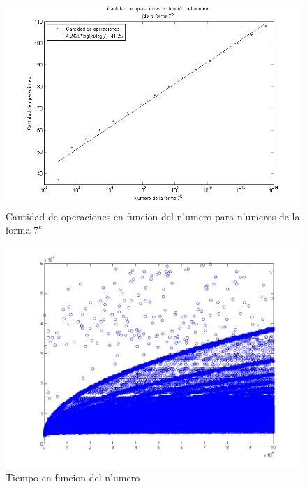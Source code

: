 \begin{figure}[H]
\centering
\includegraphics[scale=0.8]{../../codigo/ejercicio1/benchmark/graficos/potencias_de_7/graficoPotenciasDe7.png}
\caption{Cantidad de operaciones en funcion del n'umero para n'umeros de la forma $7^k$}
\end{figure}

\begin{figure}[H]
\centering
\includegraphics[scale=0.5]{../../codigo/ejercicio1/benchmark_de_tiempo/graficos/todos_los_numeros/todosLosNumerosPuntosTiempo.png}
\caption{Tiempo en funcion del n'umero}
\end{figure}

